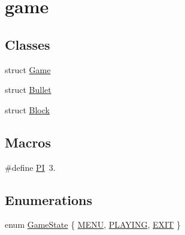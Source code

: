 \hypertarget{group__game}{}\section{game}
\label{group__game}
\subsection*{Classes}
\begin{DoxyCompactItemize}
\item 
struct \mbox{\hyperlink{struct_game}{Game}}
\item 
struct \mbox{\hyperlink{struct_bullet}{Bullet}}
\item 
struct \mbox{\hyperlink{struct_block}{Block}}
\end{DoxyCompactItemize}
\subsection*{Macros}
\begin{DoxyCompactItemize}
\item 
\#define \mbox{\hyperlink{group__game_ga598a3330b3c21701223ee0ca14316eca}{PI}}~3.
\end{DoxyCompactItemize}
\subsection*{Enumerations}
\begin{DoxyCompactItemize}
\item 
enum \mbox{\hyperlink{group__game_ga7899b65f1ea0f655e4bbf8d2a5714285}{Game\+State}} \{ \mbox{\hyperlink{group__game_gga7899b65f1ea0f655e4bbf8d2a5714285a4c40e60bc71a32b924ce1f08d57f9721}{M\+E\+NU}}, 
\mbox{\hyperlink{group__game_gga7899b65f1ea0f655e4bbf8d2a5714285af095245f5cebc27a97a124345269fed8}{P\+L\+A\+Y\+I\+NG}}, 
\mbox{\hyperlink{group__game_gga7899b65f1ea0f655e4bbf8d2a5714285a7a10b5d68d31711288e1fe0fa17dbf4f}{E\+X\+IT}}
 \}
\end{DoxyCompactItemize}
